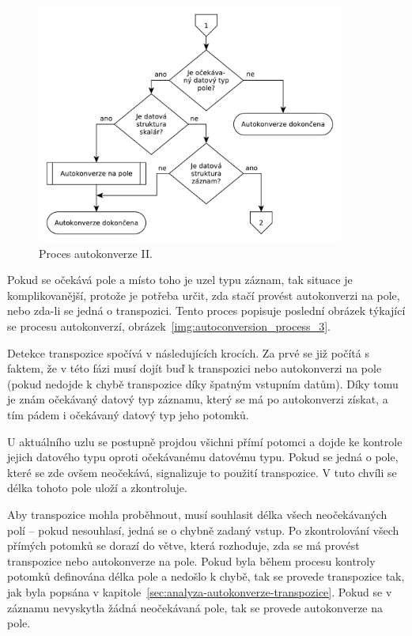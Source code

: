 \documentclass[FM,bw,DP]{tulthesis}
\begin{document}
\begin{figure}[h]
	\centering
    \includegraphics[width=0.9\textwidth]{../img/autoconversion_process_2.pdf}
    \caption{Proces autokonverze II.}
	\label{img:autoconversion_process_2}
\end{figure}

Pokud se očekává pole a místo toho je uzel typu záznam, tak situace je komplikovanější, protože je potřeba určit, zda stačí provést autokonverzi na pole, nebo zda-li se jedná o transpozici. Tento proces popisuje poslední obrázek týkající se procesu autokonverzí, obrázek~\ref{img:autoconversion_process_3}.

Detekce transpozice spočívá v následujících krocích. Za prvé se již počítá s faktem, že v této fázi musí dojít buď k transpozici nebo autokonverzi na pole (pokud nedojde k chybě transpozice díky špatným vstupním datům). Díky tomu je znám očekávaný datový typ záznamu, který se má po autokonverzi získat, a tím pádem i očekávaný datový typ jeho potomků.

U aktuálního uzlu se postupně projdou všichni přímí potomci a dojde ke kontrole jejich datového typu oproti očekávanému datovému typu. Pokud se jedná o pole, které se zde ovšem neočekává, signalizuje to použití transpozice. V tuto chvíli se délka tohoto pole uloží a zkontroluje.

Aby transpozice mohla proběhnout, musí souhlasit délka všech neočekávaných polí -- pokud nesouhlasí, jedná se o chybně zadaný vstup. Po zkontrolování všech přímých potomků se dorazí do větve, která rozhoduje, zda se má provést transpozice nebo autokonverze na pole. Pokud byla během procesu kontroly potomků definována délka pole a nedošlo k chybě, tak se provede transpozice tak, jak byla popsána v kapitole~\ref{sec:analyza-autokonverze-transpozice}. Pokud se v záznamu nevyskytla žádná neočekávaná pole, tak se provede autokonverze na pole.
\end{document}
